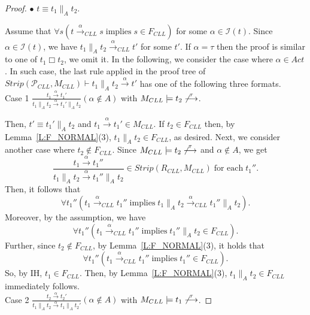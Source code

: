 \documentclass{elsarticle}
\theoremstyle{plain}
\theoremstyle{definition}
\begin{document}
\begin{proof}
  \noindent $\bullet$ $t \equiv t_1 \parallel_A t_2$.

        Assume that $\forall s(t\stackrel{\alpha}{\longrightarrow}_{CLL}s\;
        \text{implies}\;s\in F_{CLL})$ for some $\alpha \in {\mathcal I}(t)$.
        Since $\alpha \in {\mathcal I}(t)$, we have $t_1\parallel_A t_2 \stackrel{\alpha}{\longrightarrow}_{{CLL}}t'$ for some $t'$.
         If $\alpha = \tau$ then the proof is similar to one of $t_1 \Box t_2 $, we omit it.
         In the following, we consider the case where $\alpha \in Act$. In such case, the last rule applied in the proof tree of $Strip({\mathcal P}_{CLL},M_{{CLL}}) \vdash t_1 \parallel_A t_2 \stackrel{\alpha}{\longrightarrow} t'$ has one of the following three formats.\\

        \noindent Case 1 $\frac{t_1 \stackrel{\alpha}{\longrightarrow} t_1'}{t_1 \parallel_A t_2 \stackrel{\alpha}{\longrightarrow} t_1' \parallel_A t_2} (\alpha\notin A)$ with $M_{{CLL}} \models t_2 \not \stackrel{\tau}{\longrightarrow}$.

        Then, $ t' \equiv t_1' \parallel_A t_2$ and $t_1 \stackrel{\alpha}{\longrightarrow} t_1' \in M_{{CLL}}$.
        If $t_2 \in F_{{CLL}}$ then, by Lemma~\ref{L:F_NORMAL}(3), $t_1\parallel_A t_2 \in F_{{CLL}}$, as desired.
        Next, we consider another case where $t_2 \notin F_{{CLL}}$.
        Since $M_{{CLL}} \models t_2 \not \stackrel{\tau}{\longrightarrow}$ and $\alpha \notin A$, we get
        \[\frac{t_1 \stackrel{\alpha}{\longrightarrow} t_1''}{t_1 \parallel_A t_2 \stackrel{\alpha}{\longrightarrow} t_1'' \parallel_A t_2} \in Strip(R_{CLL},M_{{CLL}})\;\text{for each}\; t_1''.\]
        Then, it follows that
        \[\forall t_1'' (t_1  \stackrel{\alpha}{\longrightarrow}_{CLL} t_1'' \;\text{implies}\; t_1 \parallel_A t_2 \stackrel{\alpha}{\longrightarrow}_{CLL} t_1''\parallel_A t_2).\]
        Moreover, by the assumption, we have
         \[\forall t_1'' (t_1  \stackrel{\alpha}{\longrightarrow}_{CLL} t_1'' \;\text{implies}\; t_1''\parallel_A t_2 \in F_{CLL}).\]
         Further, since $t_2\notin F_{CLL}$, by Lemma~\ref{L:F_NORMAL}(3), it holds that
         \[\forall t_1'' (t_1  \stackrel{\alpha}{\longrightarrow}_{CLL} t_1'' \;\text{implies}\; t_1'' \in F_{CLL}).\]
         So, by IH, $t_1 \in F_{CLL}$.
         Then, by Lemma~\ref{L:F_NORMAL}(3), $t_1 \parallel_A t_2 \in F_{{CLL}}$ immediately follows.\\


       \noindent Case 2 $\frac{t_2 \stackrel{\alpha}{\longrightarrow} t_2'}{t_1 \parallel_A t_2 \stackrel{\alpha}{\longrightarrow} t_1\parallel_A t_2'}(\alpha\notin A)$ with $M_{{CLL}} \models t_1 \not \stackrel{\tau}{\longrightarrow}$.


\end{proof}
\end{document}
